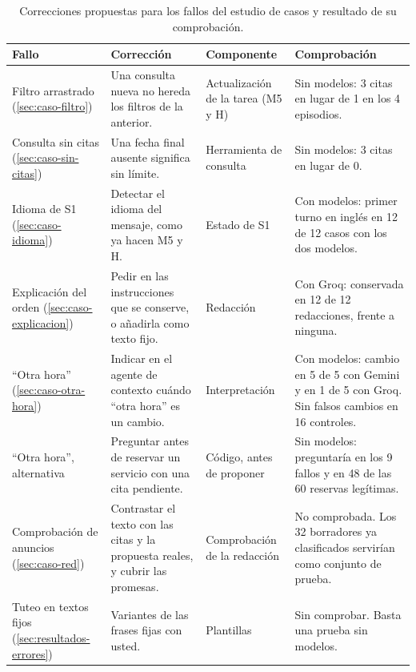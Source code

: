 \begin{table}[!htbp]
\centering
\footnotesize
\caption[Correcciones propuestas y su comprobación.]{Correcciones propuestas
para los fallos del estudio de casos y resultado de su comprobación.}
\label{tab:correcciones}
\begin{tabularx}{\textwidth}{L{0.18\textwidth}YL{0.15\textwidth}Y}
\toprule
\textbf{Fallo} & \textbf{Corrección} & \textbf{Componente} & \textbf{Comprobación} \\
\midrule
Filtro arrastrado (\ref{sec:caso-filtro}) & Una consulta nueva no hereda los filtros de la anterior. & Actualización de la tarea (M5 y H) & Sin modelos: 3 citas en lugar de 1 en los 4 episodios. \\
Consulta sin citas (\ref{sec:caso-sin-citas}) & Una fecha final ausente significa sin límite. & Herramienta de consulta & Sin modelos: 3 citas en lugar de 0. \\
Idioma de S1 (\ref{sec:caso-idioma}) & Detectar el idioma del mensaje, como ya hacen M5 y H. & Estado de S1 & Con modelos: primer turno en inglés en 12 de 12 casos con los dos modelos. \\
Explicación del orden (\ref{sec:caso-explicacion}) & Pedir en las instrucciones que se conserve, o añadirla como texto fijo. & Redacción & Con Groq: conservada en 12 de 12 redacciones, frente a ninguna. \\
\enquote{Otra hora} (\ref{sec:caso-otra-hora}) & Indicar en el agente de contexto cuándo \enquote{otra hora} es un cambio. & Interpretación & Con modelos: cambio en 5 de 5 con Gemini y en 1 de 5 con Groq. Sin falsos cambios en 16 controles. \\
\enquote{Otra hora}, alternativa & Preguntar antes de reservar un servicio con una cita pendiente. & Código, antes de proponer & Sin modelos: preguntaría en los 9 fallos y en 48 de las 60 reservas legítimas. \\
Comprobación de anuncios (\ref{sec:caso-red}) & Contrastar el texto con las citas y la propuesta reales, y cubrir las promesas. & Comprobación de la redacción & No comprobada. Los 32 borradores ya clasificados servirían como conjunto de prueba. \\
Tuteo en textos fijos (\ref{sec:resultados-errores}) & Variantes de las frases fijas con usted. & Plantillas & Sin comprobar. Basta una prueba sin modelos. \\
\bottomrule
\end{tabularx}
\end{table}

